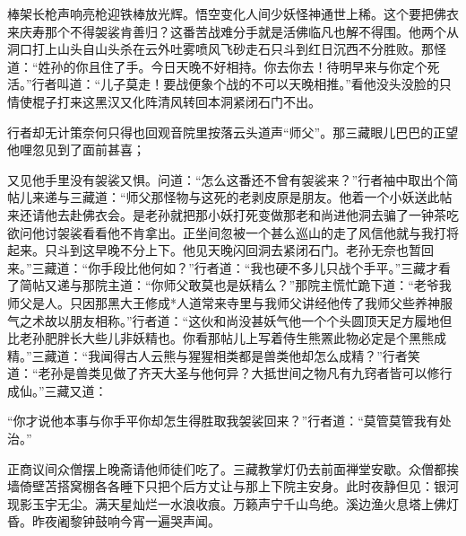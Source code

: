 \documentclass[12pt,UTF8]{ctexbook}
\begin{document}
{棒架长枪声响亮枪迎铁棒放光辉。悟空变化人间少妖怪神通世上稀。这个要把佛衣来庆寿那个不得袈裟肯善归？这番苦战难分手就是活佛临凡也解不得围。他两个从洞口打上山头自山头杀在云外吐雾喷风飞砂走石只斗到红日沉西不分胜败。那怪道：“姓孙的你且住了手。今日天晚不好相持。你去你去！待明早来与你定个死活。”行者叫道：“儿子莫走！要战便象个战的不可以天晚相推。”看他没头没脸的只情使棍子打来这黑汉又化阵清风转回本洞紧闭石门不出。

行者却无计策奈何只得也回观音院里按落云头道声“师父”。那三藏眼儿巴巴的正望他哩忽见到了面前甚喜；

又见他手里没有袈裟又惧。问道：“怎么这番还不曾有袈裟来？”行者袖中取出个简帖儿来递与三藏道：“师父那怪物与这死的老剥皮原是朋友。他着一个小妖送此帖来还请他去赴佛衣会。是老孙就把那小妖打死变做那老和尚进他洞去骗了一钟茶吃欲问他讨袈裟看看他不肯拿出。正坐间忽被一个甚么巡山的走了风信他就与我打将起来。只斗到这早晚不分上下。他见天晚闪回洞去紧闭石门。老孙无奈也暂回来。”三藏道：“你手段比他何如？”行者道：“我也硬不多儿只战个手平。”三藏才看了简帖又递与那院主道：“你师父敢莫也是妖精么？”那院主慌忙跪下道：“老爷我师父是人。只因那黑大王修成*人道常来寺里与我师父讲经他传了我师父些养神服气之术故以朋友相称。”行者道：“这伙和尚没甚妖气他一个个头圆顶天足方履地但比老孙肥胖长大些儿非妖精也。你看那帖儿上写着侍生熊罴此物必定是个黑熊成精。”三藏道：“我闻得古人云熊与猩猩相类都是兽类他却怎么成精？”行者笑道：“老孙是兽类见做了齐天大圣与他何异？大抵世间之物凡有九窍者皆可以修行成仙。”三藏又道：

“你才说他本事与你手平你却怎生得胜取我袈裟回来？”行者道：“莫管莫管我有处治。”

正商议间众僧摆上晚斋请他师徒们吃了。三藏教掌灯仍去前面禅堂安歇。众僧都挨墙倚壁苫搭窝棚各各睡下只把个后方丈让与那上下院主安身。此时夜静但见：银河现影玉宇无尘。满天星灿烂一水浪收痕。万籁声宁千山鸟绝。溪边渔火息塔上佛灯昏。昨夜阇黎钟鼓响今宵一遍哭声闻。

}
\end{document}
